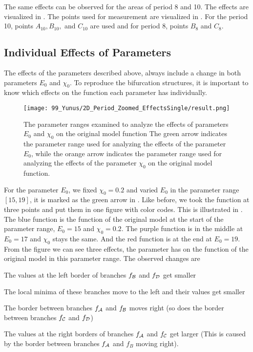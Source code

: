 The same effects can be observed for the areas of period 8 and 10.
The effects are visualized in .
The points used for measurement are visualized in .
For the period 10, points $A_{10}, B_{10},$ and $C_{10}$ are used and for period 8, points $B_8$ and $C_8$.

\subsection{Individual Effects of Parameters}
\label{sec:setup.char.paramfx.individual}

The effects of the parameters described above, always include a change in both parameters $E_0$ and $\chi_0$.
To reproduce the bifurcation structures, it is important to know which effects on the function each parameter has individually.

\begin{figure}
	\centering
	\texttt{[image: 99\_Yunus/2D\_Period\_Zoomed\_EffectsSingle/result.png]}
	\caption[The parameter ranges examined to analyze the effects of parameters on the original model function]{
		The parameter ranges examined to analyze the effects of parameters $E_0$ and $\chi_0$ on the original model function
		The green arrow indicates the parameter range used for analyzing the effects of the parameter $E_0$, while the orange arrow indicates the parameter range used for analyzing the effects of the parameter $\chi_0$ on the original model function.
	}
	\label{fig:setup.char.evolution.single.map}
\end{figure}

For the parameter $E_0$, we fixed $\chi_0 = 0.2$ and varied $E_0$ in the parameter range $[15, 19]$, it is marked as the green arrow in .
Like before, we took the function at three points and put them in one figure with color codes.
This is illustrated in .
The blue function is the function of the original model at the start of the parameter range, $E_0 = 15$ and $\chi_0 = 0.2$.
The purple function is in the middle at $E_0 = 17$ and $\chi_0$ stays the same.
And the red function is at the end at $E_0 = 19$.
From the figure we can see three effects, the parameter has on the function of the original model in this parameter range.
The observed changes are
\begin{enumerate*}
	\item The values at the left border of branches $f_{\mathcal{B}}$ and $f_{\mathcal{D}}$ get smaller
	\item The local minima of these branches move to the left and their values get smaller
	\item The border between branches $f_{\mathcal{A}}$ and $f_{\mathcal{B}}$ moves right (so does the border between branches $f_{\mathcal{C}}$ and $f_{\mathcal{D}}$)
	\item The values at the right borders of branches $f_{\mathcal{A}}$ and $f_{\mathcal{C}}$ get larger (This is caused by the border between branches $f_{\mathcal{A}}$ and $f_B$ moving right).
\end{enumerate*}

